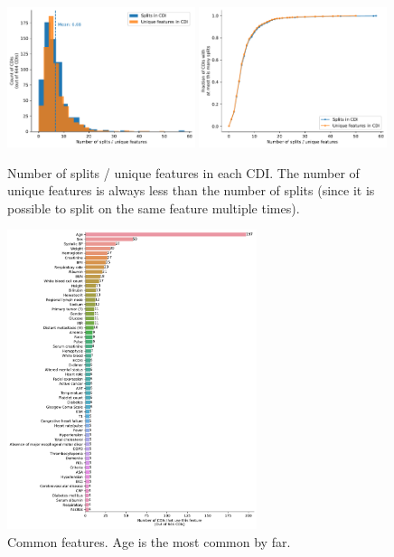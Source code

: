 \documentclass[10pt]{article}
\begin{document}
\begin{figure}[H]
    \centering
    \includegraphics[width=0.49\textwidth]{../results/num_rules_hist.pdf}
    \includegraphics[width=0.49\textwidth]{../results/num_rules_cdf.pdf}
    \caption{Number of splits / unique features in each CDI.
    The number of unique features is always less than the number of splits (since it is possible to split on the same feature multiple times).}
\end{figure}

\begin{figure}[H]
    \centering
    \includegraphics[width=0.65\textwidth]{../results/common_features.pdf}
    \caption{Common features. Age is the most common by far.}
\end{figure}
\end{document}

